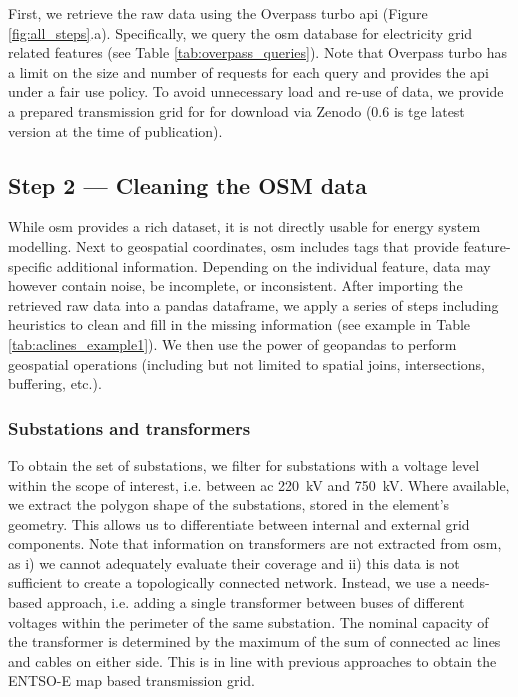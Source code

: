\documentclass[fleqn,10pt]{wlscirep}
\let\autocite\cite
\begin{document}
First, we retrieve the raw data using the Overpass turbo \gls{api}\autocite{raiferOverpassTurbo2024} (Figure \ref{fig:all_steps}.a). Specifically, we query the \gls{osm} database for electricity grid related features (see Table \ref{tab:overpass_queries}). Note that Overpass turbo has a limit on the size and number of requests for each query and provides the \gls{api} under a fair use policy. To avoid unnecessary load and re-use of data, we provide a prepared transmission grid for for download via Zenodo (0.6 is tge latest version at the time of publication). \autocite{xiongPrebuiltElectricityNetwork2024}

\subsection*{Step 2 --- Cleaning the OSM data}
While \gls{osm} provides a rich dataset, it is not directly usable for energy system modelling. Next to geospatial coordinates, \gls{osm} includes tags that provide feature-specific additional information. Depending on the individual feature, data may however contain noise, be incomplete, or inconsistent. After importing the retrieved raw data into a pandas dataframe,\autocite{mckinneyDataStructuresStatistical2010} we apply a series of steps including heuristics to clean and fill in the missing information (see example in Table \ref{tab:aclines_example1}). We then use the power of geopandas\autocite{jordahlGeopandasGeopandasV0812020} to perform geospatial operations (including but not limited to spatial joins, intersections, buffering, etc.).

\subsubsection*{Substations and transformers}
To obtain the set of substations, we filter for substations with a voltage level within the scope of interest, i.e. between \acrshort{ac} \SI{220}{\kilo\volt} and \SI{750}{\kilo\volt}. Where available, we extract the polygon shape of the substations, stored in the element's geometry. This allows us to differentiate between internal and external grid components. 
Note that information on transformers are not extracted from \acrshort{osm}, as i) we cannot adequately evaluate their coverage and ii) this data is not sufficient to create a topologically connected network. Instead, we use a needs-based approach, i.e. adding a single transformer between buses of different voltages within the perimeter of the same substation. The nominal capacity of the transformer is determined by the maximum of the sum of connected \acrshort{ac} lines and cables on either side. This is in line with previous approaches to obtain the ENTSO-E map based transmission grid.\autocite{horschPyPSAEurOpenOptimisation2018}
\end{document}
